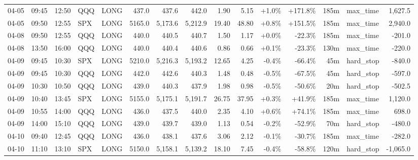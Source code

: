 \documentclass[11pt,a4paper,twoside]{article}
\begin{document}
\begin{landscape}
\begin{center}
\begin{longtable}{>{\color{txtmain}}l l l l l r r r r r r r r >{\color{txtmain}}l r}
04-05 & 09:45 & 12:50 & QQQ & LONG & 437.0 & 437.6 & 442.0 & 1.90 & 5.15 & \textcolor{wingreen}{+1.0\%} & \textcolor{wingreen}{+171.8\%} & 185m & max\_time & \textcolor{wingreen}{1,627.5} \\
04-05 & 09:50 & 12:55 & SPX & LONG & 5165.0 & 5,173.6 & 5,212.9 & 19.40 & 48.80 & \textcolor{wingreen}{+0.8\%} & \textcolor{wingreen}{+151.5\%} & 185m & max\_time & \textcolor{wingreen}{2,940.0} \\
04-08 & 09:50 & 12:55 & QQQ & LONG & 440.0 & 440.5 & 440.7 & 1.50 & 1.17 & \textcolor{wingreen}{+0.0\%} & \textcolor{lossred}{-22.3\%} & 185m & max\_time & \textcolor{lossred}{-201.0} \\
04-08 & 13:50 & 16:00 & QQQ & LONG & 440.0 & 440.4 & 440.6 & 0.86 & 0.66 & \textcolor{wingreen}{+0.1\%} & \textcolor{lossred}{-23.3\%} & 130m & max\_time & \textcolor{lossred}{-220.0} \\
04-09 & 09:45 & 10:30 & SPX & LONG & 5210.0 & 5,216.3 & 5,193.2 & 12.65 & 4.25 & \textcolor{lossred}{-0.4\%} & \textcolor{lossred}{-66.4\%} & 45m & hard\_stop & \textcolor{lossred}{-840.0} \\
04-09 & 09:45 & 10:30 & QQQ & LONG & 442.0 & 442.6 & 440.3 & 1.48 & 0.48 & \textcolor{lossred}{-0.5\%} & \textcolor{lossred}{-67.5\%} & 45m & hard\_stop & \textcolor{lossred}{-597.0} \\
04-09 & 10:30 & 10:50 & QQQ & LONG & 439.0 & 440.3 & 437.9 & 1.98 & 0.98 & \textcolor{lossred}{-0.5\%} & \textcolor{lossred}{-50.6\%} & 20m & hard\_stop & \textcolor{lossred}{-502.5} \\
04-09 & 10:40 & 13:45 & SPX & LONG & 5155.0 & 5,175.1 & 5,191.7 & 26.75 & 37.95 & \textcolor{wingreen}{+0.3\%} & \textcolor{wingreen}{+41.9\%} & 185m & max\_time & \textcolor{wingreen}{1,120.0} \\
04-09 & 10:55 & 14:00 & QQQ & LONG & 436.0 & 437.5 & 440.0 & 2.35 & 4.10 & \textcolor{wingreen}{+0.6\%} & \textcolor{wingreen}{+74.1\%} & 185m & max\_time & \textcolor{wingreen}{698.0} \\
04-09 & 14:00 & 15:10 & QQQ & LONG & 439.0 & 439.7 & 439.0 & 1.13 & 0.54 & \textcolor{lossred}{-0.2\%} & \textcolor{lossred}{-52.9\%} & 70m & hard\_stop & \textcolor{lossred}{-480.0} \\
04-10 & 09:40 & 12:45 & QQQ & LONG & 436.0 & 438.1 & 437.6 & 3.06 & 2.12 & \textcolor{lossred}{-0.1\%} & \textcolor{lossred}{-30.7\%} & 185m & max\_time & \textcolor{lossred}{-282.0} \\
04-10 & 11:10 & 13:10 & SPX & LONG & 5150.0 & 5,158.1 & 5,139.2 & 18.10 & 7.45 & \textcolor{lossred}{-0.4\%} & \textcolor{lossred}{-58.8\%} & 120m & hard\_stop & \textcolor{lossred}{-1,065.0} \\

\end{longtable}
\end{center}
\end{landscape}
\end{document}
